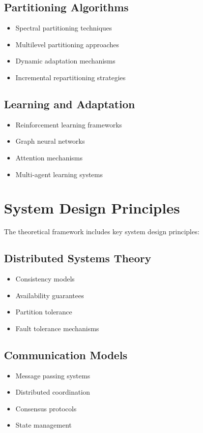 \subsection{Partitioning Algorithms}
\begin{itemize}
    \item Spectral partitioning techniques
    \item Multilevel partitioning approaches
    \item Dynamic adaptation mechanisms
    \item Incremental repartitioning strategies
\end{itemize}

\subsection{Learning and Adaptation}
\begin{itemize}
    \item Reinforcement learning frameworks
    \item Graph neural networks
    \item Attention mechanisms
    \item Multi-agent learning systems
\end{itemize}

\section{System Design Principles}
The theoretical framework includes key system design principles:

\subsection{Distributed Systems Theory}
\begin{itemize}
    \item Consistency models
    \item Availability guarantees
    \item Partition tolerance
    \item Fault tolerance mechanisms
\end{itemize}

\subsection{Communication Models}
\begin{itemize}
    \item Message passing systems
    \item Distributed coordination
    \item Consensus protocols
    \item State management
\end{itemize}

